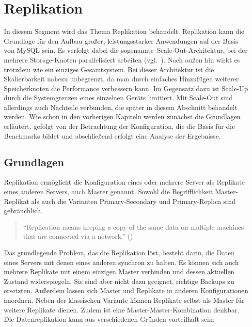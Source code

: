 
\chapter{Replikation}\label{ch:replikation}
In diesem Segment wird das Thema Replikation behandelt.
Replikation kann die Grundlage für den Aufbau großer, leistungsstarker Anwendungen auf der Basis von MySQL sein.
Es verfolgt dabei die sogenannte~\glqq Scale-Out\grqq-Architektur, bei der mehrere Storage-Knoten parallelisiert arbeiten (vgl.\ \cite[S. 531]{schwartz2012high}).
Nach außen hin wirkt es trotzdem wie ein einziges Gesamtsystem.
Bei dieser Architektur ist die Skalierbarkeit nahezu unbegrenzt, da man durch einfaches Hinzufügen weiterer Speicherknoten die Performance verbessern kann.
Im Gegensatz dazu ist Scale-Up durch die Systemgrenzen eines einzelnen Geräts limitiert.
Mit Scale-Out sind allerdings auch Nachteile verbunden, die später in diesem Abschnitt behandelt werden.
Wie schon in den vorherigen Kapiteln werden zunächst die Grundlagen erläutert, gefolgt von der Betrachtung der Konfiguration, die die Basis für die Benchmarks bildet und abschließend erfolgt eine Analyse der Ergebnisse.

\section{Grundlagen}\label{sec:replication-grundlagen}
Replikation ermöglicht die Konfiguration eines oder mehrere Server als Replikate eines anderen Servers, auch Master genannt.
Sowohl die Begrifflichkeit Master-Replikat als auch die Varianten Primary-Secondary und Primary-Replica sind gebräuchlich.

\begin{quote}
  \enquote{Replication means keeping a copy of the same data on multiple machines that are connected via a network.} (\cite[S. 151]{kleppmann2017designing})
\end{quote}

Das grundlegende Problem, das die Replikation löst, besteht darin, die Daten eines Servers mit denen eines anderen synchron zu halten.
Es können sich auch mehrere Replikate mit einem einzigen Master verbinden und dessen aktuellen Zustand widerspiegeln.
Sie sind aber nicht dazu geeignet, richtige Backups zu ersetzten.
Außerdem lassen sich Master und Replikate in anderen Konfigurationen anordnen.
Neben der klassischen Variante können Replikate selbst als Master für weitere Replikate dienen.
Zudem ist eine Master-Master-Kombination denkbar.
Die Datenreplikation kann aus verschiedenen Gründen vorteilhaft sein:

